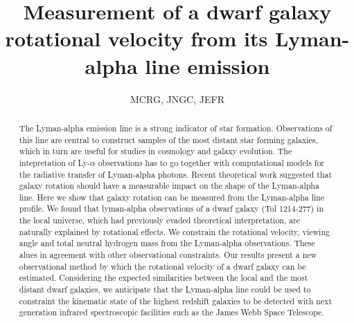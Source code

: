 \documentclass{article}
\title{Measurement of a dwarf galaxy rotational velocity from its Lyman-alpha
  line emission}
\author{MCRG, JNGC, JEFR}
\begin{document}
\maketitle
\begin{abstract}
The Lyman-alpha emission line is a strong indicator of star formation.
Observations of this line are central to construct samples of the most
distant star forming galaxies, which in turn are useful for studies in
cosmology and galaxy evolution.  
The intepretation of Ly-$\alpha$ observations has to go together with
computational models for the radiative transfer of Lyman-alpha photons.
Recent theoretical work suggested that galaxy rotation should have a
measurable impact on the shape of the Lyman-alpha line. 
Here we show that galaxy rotation can be measured from the Lyman-alpha
line profile. 
We found that lyman-alpha observations of a dwarf galaxy (Tol 1214-277) in
the local universe, which had previously evaded theoretical 
interpretation, are naturally explained by rotational effects.
We constrain the rotational velocity, viewing angle and total
neutral hydrogen mass from the Lyman-alpha observations.
These alues in agreement with other observational constraints.
Our results present a new observational method by which the rotational
velocity of a dwarf galaxy can be estimated. 
Considering the expected similarities between the local and the most
distant dwarf galaxies, we anticipate that the Lyman-alpha line could be
used to constraint the kinematic state of the highest redshift
galaxies to be detected with next generation infrared spectroscopic
facilities such as the James Webb Space Telescope.


\end{abstract}
\end{document}
